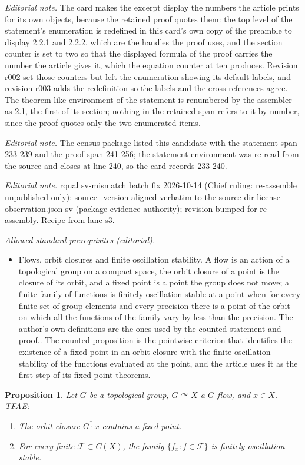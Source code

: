 \documentclass[10pt,a4paper]{article}
\newtheorem{prop}[theo]{Proposition}
\theoremstyle{definition}
\numberwithin{equation}{section}
\numberwithin{figure}{section}
\numberwithin{table}{section}
\newcommand{\actson}{\curvearrowright}
\begin{document}
\noindent\textit{Editorial note.} The card makes the excerpt display the numbers the article prints for its own objects, because the retained proof quotes them: the top level of the statement's enumeration is redefined in this card's own copy of the preamble to display 2.2.1 and 2.2.2, which are the handles the proof uses, and the section counter is set to two so that the displayed formula of the proof carries the number the article gives it, which the equation counter at ten produces. Revision r002 set those counters but left the enumeration showing its default labels, and revision r003 adds the redefinition so the labels and the cross-references agree. The theorem-like environment of the statement is renumbered by the assembler as 2.1, the first of its section; nothing in the retained span refers to it by number, since the proof quotes only the two enumerated items.\par\medskip
\noindent\textit{Editorial note.} The census package listed this candidate with the statement span 233-239 and the proof span 241-256; the statement environment was re-read from the source and closes at line 240, so the card records 233-240.\par\medskip
\noindent\textit{Editorial note.} rqual sv-mismatch batch fix 2026-10-14 (Chief ruling: re-assemble unpublished only): source\_version aligned verbatim to the source dir license-observation.json sv (package evidence authority); revision bumped for re-assembly. Recipe from lane-s3.\par\medskip
\noindent\textit{Allowed standard prerequisites (editorial).}\begin{itemize}
\item Flows, orbit closures and finite oscillation stability. A flow is an action of a topological group on a compact space, the orbit closure of a point is the closure of its orbit, and a fixed point is a point the group does not move; a finite family of functions is finitely oscillation stable at a point when for every finite set of group elements and every precision there is a point of the orbit on which all the functions of the family vary by less than the precision. The author's own definitions are the ones used by the counted statement and proof.. The counted proposition is the pointwise criterion that identifies the existence of a fixed point in an orbit closure with the finite oscillation stability of the functions evaluated at the point, and the article uses it as the first step of its fixed point theorems.
\end{itemize}\medskip
\begin{prop}
Let $G$ be a topological group, $G\actson X$ a $G$-flow, and $x\in X$. TFAE:
\begin{enumerate}
\item \label{2.2.1} The orbit closure $\overline{G\cdot x}$ contains a fixed point.
\item \label{2.2.2} For every finite $\mathcal F\subset C(X)$, the family $\{ f_{x}:f\in \mathcal F\}$ is finitely oscillation stable.
\end{enumerate}
\end{prop}
\end{document}
